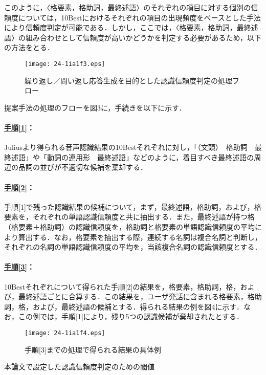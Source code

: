 \documentclass[japanese]{jnlp_1.4}
\begin{document}
このように，〈格要素，格助詞，最終述語〉のそれぞれの項目に対する個別の信頼度については，10Bestにおけるそれぞれの項目の出現頻度をベースとした手法により信頼度判定が可能である．しかし，ここでは，〈格要素，格助詞，最終述語〉の組み合わせとして信頼度が高いかどうかを判定する必要があるため，以下の方法をとる．

\begin{figure}[b]
\begin{center}
\texttt{[image: 24-1ia1f3.eps]}
\end{center}
\caption{繰り返し／問い返し応答生成を目的とした認識信頼度判定の処理フロー}
\label{fig:3}
\end{figure}

提案手法の処理のフローを図3に，手続きを以下に示す．


\paragraph{\underline{手順[1]}：}Juliusより得られる音声認識結果の10Bestそれぞれに対し，「（文頭）　格助詞　最終述語」や「動詞の連用形　最終述語」などのように，着目すべき最終述語の周辺の品詞の並びが不適切な候補を棄却する．


\paragraph{\underline{手順[2]}：}手順[1]で残った認識結果の候補について，まず，最終述語，格助詞，および，格要素を，それぞれの単語認識信頼度\cite{no42}と共に抽出する．また，最終述語が持つ格（格要素＋格助詞）の認識信頼度を，格助詞と格要素の単語認識信頼度の平均により算出する．なお，格要素を抽出する際，連続する名詞は複合名詞と判断し，それぞれの名詞の単語認識信頼度の平均を，当該複合名詞の認識信頼度とする．


\paragraph{\underline{手順[3]}：}10Bestそれぞれについて得られた手順[2]の結果を，格要素，格助詞，格，および，最終述語ごとに合算する．この結果を，ユーザ発話に含まれる格要素，格助詞，格，および，最終述語の候補とする．得られる結果の例を図4に示す．なお，この例では，手順[1]により，残り5つの認識候補が棄却されたとする．

\begin{figure}[b]
\begin{center}
\texttt{[image: 24-1ia1f4.eps]}
\end{center}
\caption{手順[3]までの処理で得られる結果の具体例}
\label{fig:4}
\end{figure}
\begin{table}[b]
\caption{本論文で設定した認識信頼度判定のための閾値}
\label{table:6}

\end{table}
\end{document}
